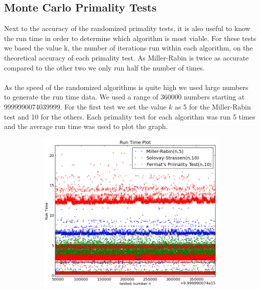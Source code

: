 \documentclass[compressed,final,notitlepage,narroweqnarray,inline,twoside,]{ieee}
\begin{document}
\subsection{Monte Carlo Primality Tests}
Next to the accuracy of the randomized primality tests, it is also useful to know the run time in order to determine which algorithm is most viable. For these tests we based the value k, the number of iterations run within each algorithm, on the theoretical accuracy of each primality test. As Miller-Rabin is twice as accurate compared to the other two we only run half the number of times. \\\\ As the speed of the randomized algorithms is quite high we used large numbers to generate the run time data. We used a range of 360000 numbers starting at 9999990074039999. For the first test we set the value $k$ as 5 for the Miller-Rabin test and 10 for the others. Each primality test for each algorithm was run 5 times and the average run time was used to plot the graph.
\begin{figure}
        \centering
        \begin{subfigure}[b]{0.5\textwidth}
                \includegraphics[width=\textwidth]{../images/all_singlethread_small_runtime}
                \label{fig:gull}
        \end{subfigure}
        \vspace{-30pt}\caption{}\label{fig:randomized_runtime_small}
\end{figure}
\end{document}
